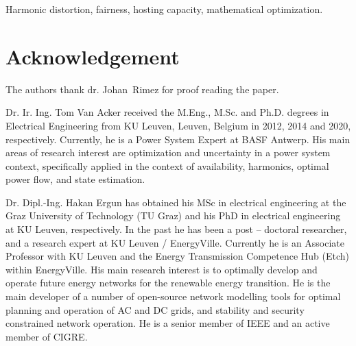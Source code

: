 \documentclass[journal]{IEEEtran}
\begin{document}
\begin{IEEEkeywords}
Harmonic distortion, fairness, hosting capacity, mathematical optimization.
\end{IEEEkeywords}

\IEEEpeerreviewmaketitle








\section*{Acknowledgement}
The authors thank dr. Johan~Rimez for proof reading the paper.




\begin{IEEEbiographynophoto}{Dr. Ir. Ing. Tom Van Acker} received the M.Eng., M.Sc. and Ph.D. degrees in Electrical Engineering from KU Leuven, Leuven, Belgium in 2012, 2014 and 2020, respectively. Currently, he is a Power System Expert at BASF Antwerp. His main areas of research interest are optimization and uncertainty in a power system context, specifically applied in the context of availability, harmonics, optimal power flow, and state estimation. 
\end{IEEEbiographynophoto}

\begin{IEEEbiographynophoto}{Dr. Dipl.-Ing. Hakan Ergun} has obtained his MSc in electrical engineering at the Graz University of Technology (TU Graz) and his PhD in electrical engineering at KU Leuven, respectively. In the past he has been a post – doctoral researcher, and a research expert at KU Leuven / EnergyVille. Currently he is an Associate Professor with KU Leuven and the Energy Transmission Competence Hub (Etch) within EnergyVille.
His main research interest is to optimally develop and operate future energy networks for the renewable energy transition. He is the main developer of a number of open-source network modelling tools for optimal planning and operation of AC and DC grids, and stability and security constrained network operation. He is a senior member of IEEE and an active member of CIGRE. 

\end{IEEEbiographynophoto}
\end{document}
